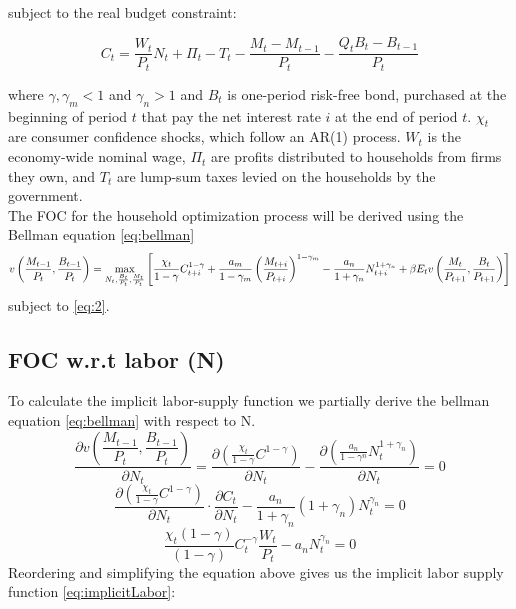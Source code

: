 \documentclass[10pt,a4paper]{article}
\begin{document}
subject to the real budget constraint:

\begin{equation}\label{eq:2}
C_{t} = \dfrac{W_{t}}{P_{t}}N_{t} + \Pi_{t} -T_{t} 
- \dfrac{M_{t}-M_{t-1}}{P_{t}}
- \dfrac{Q_{t} B_{t}- B_{t-1}}{P_{t}}
\end{equation}


where $\gamma, \gamma_{m} < 1 $ and $\gamma_{n} > 1$ and
$B_{t}$ is one-period risk-free bond, purchased at the beginning of period $t$ that pay the net interest rate $i$ at the end of period $t$. $\chi_{t}$ are consumer confidence shocks, which follow an AR(1) process. $W_{t}$ is the economy-wide nominal wage, $\Pi_{t}$ are profits distributed to households from firms they own, and $T_{t}$ are lump-sum taxes levied on the households by the government. \\

The FOC for the household optimization process will be derived using the Bellman equation \eqref{eq:bellman}
\begin{equation}\label{eq:bellman}
v \left( \dfrac{M_{t-1}}{P_{t}}, \dfrac{B_{t-1}}{P_{t}} \right)
= \max_{N_{t}, \frac{B_{t}}{P_{t}}, \frac{M_{t}}{P_{t}}}
\left[
\dfrac{\chi_{t}}{1-\gamma} C^{1-\gamma}_{t+i}
+ 
\dfrac{a_{m}}{1-\gamma_{m}} \left(\dfrac{M_{t+i}}{P_{t+i}}\right)^{1-\gamma_{m}}
-
\dfrac{a_{n}}{1+\gamma_{n}} N_{t+i}^{1+\gamma_{n}}
\\
+ 
\beta E_{t} v \left( \dfrac{M_{t}}{P_{t+1}}, \dfrac{B_{t}}{P_{t+1}} \right) \right]
\end{equation}
subject to \eqref{eq:2}.
\subsection{FOC w.r.t labor (N)}
To calculate the implicit labor-supply function we partially derive the bellman equation \eqref{eq:bellman} with respect to N.
\begin{equation}
\frac{\partial v \left( \dfrac{M_{t-1}}{P_{t}}, \dfrac{B_{t-1}}{P_{t}} \right)}{\partial N_t} =
\frac{\partial \left(\frac{\chi_{t}}{1-\gamma} C^{1-\gamma}\right)}
{\partial N_{t}}
-
\frac{\partial \left( 
\frac{a_{n}}{1-\gamma^{n}} N_{t}^{1+\gamma_{n}} \right)}
{\partial N_{t}}
= 0 \end{equation}
\begin{equation}
\frac{\partial \left(\frac{\chi_{t}}{1-\gamma} C^{1-\gamma}\right)}
{\partial N_{t}} \cdot \dfrac{\partial C_{t}}{\partial N_{t}}
-
\dfrac{a_{n}}{1+\gamma_{n}}(1+\gamma_{n})N_{t}^{\gamma_{n}}
= 0 
\end{equation}
\begin{equation}
\dfrac{\chi_{t}(1-\gamma)}{(1-\gamma)} C_{t}^{-\gamma} \dfrac{W_{t}}{P_{t}}
- a_{n} N_{t}^{\gamma_{n}}
= 0 \end{equation}
Reordering and simplifying the equation above gives us the implicit labor supply function \eqref{eq:implicitLabor}:
\end{document}
